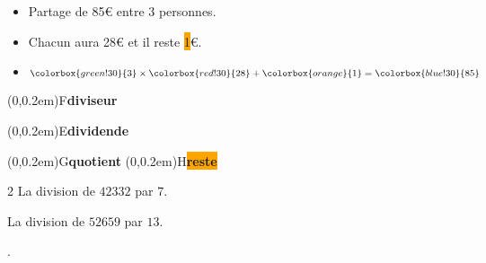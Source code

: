 \begin{exemple*1}
	\phantom{rrr}
	
	\begin{minipage}{0.5\linewidth}
		\begin{itemize}
			\item Partage de 85\euro{} entre 3 personnes.
			\item Chacun aura \colorbox{red!30}{28}\euro{} et il reste \colorbox{orange}{1}\euro{}.
			\item $\colorbox{green!30}{3}\times \colorbox{red!30}{28}+ \colorbox{orange}{1}=\colorbox{blue!30}{85}$
		\end{itemize}
	\end{minipage}
	\begin{minipage}{0.5\linewidth}
		\begin{center}
			\qquad
			\begin{minipage}[b]{2cm}
				\pnode(0,0.2em){F}{\colorbox{green!30}{\textbf{diviseur}}}
					\par
				\pnode(0,0.2em){E}{\colorbox{blue!30}{\textbf{dividende}}}
				\par
				\pnode(0,0.2em){G}{\colorbox{red!30}{\textbf{quotient}}}
				\pnode(0,0.2em){H}{\colorbox{orange}{\textbf{reste}}}
			\end{minipage}
		\end{center}
	\end{minipage}
\end{exemple*1}
\vfill
\clearpage
\vspace*{-15mm}
\begin{exemple*1}
	\begin{multicols}2
	La division de $\num{42332}$ par $7$.

	\medskip
	\begin{center}
	\end{center}
	\columnbreak
	La division de $\num{52659}$ par $13$.

	\medskip
	\begin{center}
		.
	\end{center}
\end{multicols}
\end{exemple*1}

